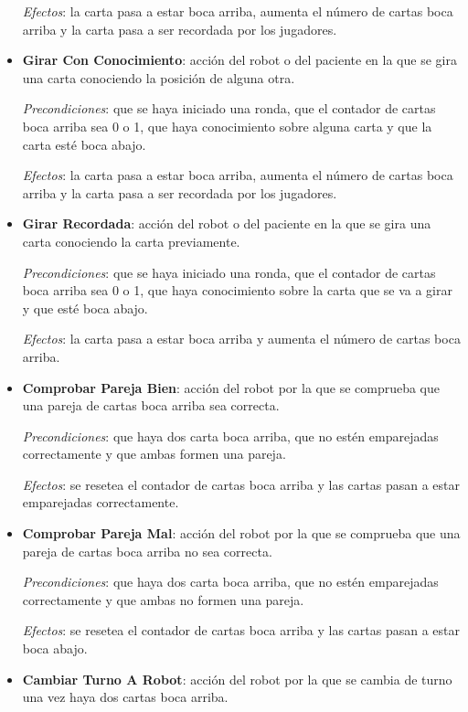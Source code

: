 \documentclass{uc3mpracticas}
\begin{document}
\begin{itemize}
      \textit{Efectos}: la carta pasa a estar boca arriba, aumenta el número de cartas boca arriba y la carta pasa a ser recordada por los jugadores.

    \item \textbf{Girar Con Conocimiento}: acción del robot o del paciente en la que se gira una carta conociendo la posición de alguna otra.

      \textit{Precondiciones}: que se haya iniciado una ronda, que el contador de cartas boca arriba sea 0 o 1, que haya conocimiento sobre alguna carta y que la carta esté boca abajo.

      \textit{Efectos}: la carta pasa a estar boca arriba, aumenta el número de cartas boca arriba y la carta pasa a ser recordada por los jugadores.

    \item \textbf{Girar Recordada}: acción del robot o del paciente en la que se gira una carta conociendo la carta previamente.

      \textit{Precondiciones}: que se haya iniciado una ronda, que el contador de cartas boca arriba sea 0 o 1, que haya conocimiento sobre la carta que se va a girar y que esté boca abajo.

      \textit{Efectos}: la carta pasa a estar boca arriba y aumenta el número de cartas boca arriba.

    \item \textbf{Comprobar Pareja Bien}: acción del robot por la que se comprueba que una pareja de cartas boca arriba sea correcta.

      \textit{Precondiciones}: que haya dos carta boca arriba, que no estén emparejadas correctamente y que ambas formen una pareja.

      \textit{Efectos}: se resetea el contador de cartas boca arriba y las cartas pasan a estar emparejadas correctamente.

    \item \textbf{Comprobar Pareja Mal}: acción del robot por la que se comprueba que una pareja de cartas boca arriba no sea correcta.

      \textit{Precondiciones}: que haya dos carta boca arriba, que no estén emparejadas correctamente y que ambas no formen una pareja.

      \textit{Efectos}: se resetea el contador de cartas boca arriba y las cartas pasan a estar boca abajo.

    \item \textbf{Cambiar Turno A Robot}: acción del robot por la que se cambia de turno una vez haya dos cartas boca arriba.


\end{itemize}
\end{document}
